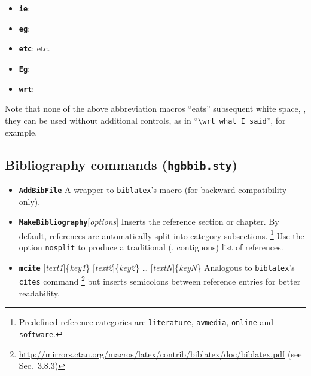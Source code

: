 \documentclass[english]{hgbarticle}
\begin{document}
\begin{itemize}
    \item \textbf{\texttt{{\bs}ie}}: \ie
    \item \textbf{\texttt{{\bs}eg}}: \eg
    \item \textbf{\texttt{{\bs}etc}}: etc.
    \item \textbf{\texttt{{\bs}Eg}}: \Eg
    \item \textbf{\texttt{{\bs}wrt}}: \wrt
\end{itemize}

\noindent
Note that none of the above abbreviation macros ``eats'' subsequent white
space, \ie, they can be used without additional controls, as in
``\verb!\wrt what I said!'', for example.

\subsection{Bibliography commands (\texttt{hgbbib.sty})}

\begin{itemize}
    \item 
    \textbf{\texttt{{\bs}AddBibFile}}\newline
    A wrapper to \texttt{biblatex}'s \verb!! macro (for backward compatibility only).
    \item
    \textbf{\texttt{{\bs}MakeBibliography}}[\emph{options}]
    \newline
    Inserts the
    reference section or chapter. By default, references are automatically
    split into category subsections.%
    \footnote{Predefined reference categories are \texttt{literature},
        \texttt{avmedia}, \texttt{online} and \texttt{software}.}
    Use the option \texttt{nosplit} to produce a traditional (\ie,
    contiguous) list of references.
    \item
    \textbf{\texttt{{\bs}mcite}}%
        [\emph{text1}]\{\emph{key1}\}%
        [\emph{text2}]\{\emph{key2}\}%
        \ldots
        [\emph{textN}]\{\emph{keyN}\}%
    \newline
    Analogous to \texttt{bib\-la\-tex}'s \texttt{{\bs}cites} command%
    \footnote{%
    \url{http://mirrors.ctan.org/macros/latex/contrib/biblatex/doc/biblatex.pdf}
    (see Sec.~3.8.3)} but inserts semicolons between reference entries for
    better readability.
\end{itemize}

\end{document}
